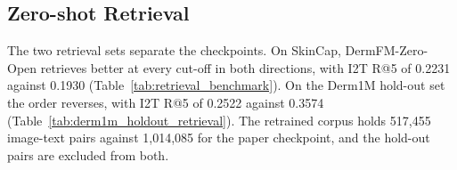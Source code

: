\documentclass{article}
\begin{document}
\begin{table}[H]
\centering
{}
\caption{Linear probing with 100\% of the training data. The best value in each column is in bold.}
\label{tab:lp_100_benchmark}
\end{table}

\subsection{Zero-shot Retrieval}

The two retrieval sets separate the checkpoints. On SkinCap, DermFM-Zero-Open retrieves better at every cut-off in both directions, with I2T R@5 of 0.2231 against 0.1930 (Table~\ref{tab:retrieval_benchmark}). On the Derm1M hold-out set the order reverses, with I2T R@5 of 0.2522 against 0.3574 (Table~\ref{tab:derm1m_holdout_retrieval}). The retrained corpus holds 517,455 image-text pairs against 1,014,085 for the paper checkpoint, and the hold-out pairs are excluded from both.
\end{document}
